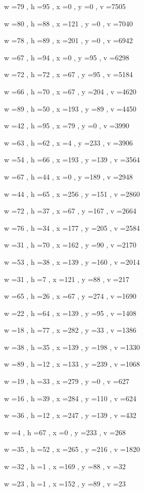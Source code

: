 \documentclass[11pt]{article}
\begin{document}
w =79 , h =95 , x =0 , y =0 , v =7505
\par
w =80 , h =88 , x =121 , y =0 , v =7040
\par
w =78 , h =89 , x =201 , y =0 , v =6942
\par
w =67 , h =94 , x =0 , y =95 , v =6298
\par
w =72 , h =72 , x =67 , y =95 , v =5184
\par
w =66 , h =70 , x =67 , y =204 , v =4620
\par
w =89 , h =50 , x =193 , y =89 , v =4450
\par
w =42 , h =95 , x =79 , y =0 , v =3990
\par
w =63 , h =62 , x =4 , y =233 , v =3906
\par
w =54 , h =66 , x =193 , y =139 , v =3564
\par
w =67 , h =44 , x =0 , y =189 , v =2948
\par
w =44 , h =65 , x =256 , y =151 , v =2860
\par
w =72 , h =37 , x =67 , y =167 , v =2664
\par
w =76 , h =34 , x =177 , y =205 , v =2584
\par
w =31 , h =70 , x =162 , y =90 , v =2170
\par
w =53 , h =38 , x =139 , y =160 , v =2014
\par
w =31 , h =7 , x =121 , y =88 , v =217
\par
w =65 , h =26 , x =67 , y =274 , v =1690
\par
w =22 , h =64 , x =139 , y =95 , v =1408
\par
w =18 , h =77 , x =282 , y =33 , v =1386
\par
w =38 , h =35 , x =139 , y =198 , v =1330
\par
w =89 , h =12 , x =133 , y =239 , v =1068
\par
w =19 , h =33 , x =279 , y =0 , v =627
\par
w =16 , h =39 , x =284 , y =110 , v =624
\par
w =36 , h =12 , x =247 , y =139 , v =432
\par
w =4 , h =67 , x =0 , y =233 , v =268
\par
w =35 , h =52 , x =265 , y =216 , v =1820
\par
w =32 , h =1 , x =169 , y =88 , v =32
\par
w =23 , h =1 , x =152 , y =89 , v =23
\par
\newpage
\end{document}
